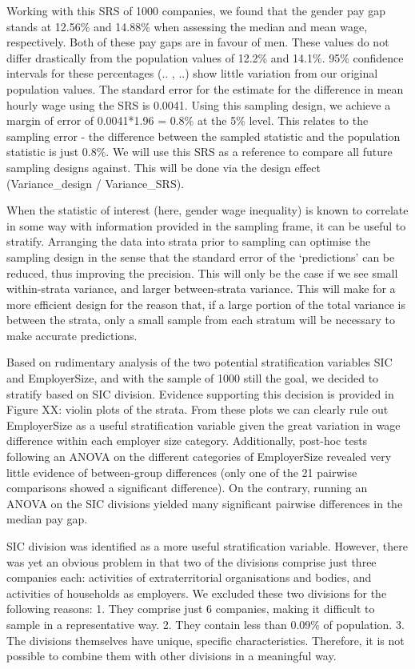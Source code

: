 \documentclass[]{article}
\begin{document}
Working with this SRS of 1000 companies, we found that the gender pay
gap stands at 12.56\% and 14.88\% when assessing the median and mean
wage, respectively. Both of these pay gaps are in favour of men. These
values do not differ drastically from the population values of 12.2\%
and 14.1\%. 95\% confidence intervals for these percentages (.. , ..)
show little variation from our original population values. The standard
error for the estimate for the difference in mean hourly wage using the
SRS is 0.0041. Using this sampling design, we achieve a margin of error
of 0.0041*1.96 = 0.8\% at the 5\% level. This relates to the sampling
error - the difference between the sampled statistic and the population
statistic is just 0.8\%. We will use this SRS as a reference to compare
all future sampling designs against. This will be done via the design
effect (Variance\_design / Variance\_SRS).

When the statistic of interest (here, gender wage inequality) is known
to correlate in some way with information provided in the sampling
frame, it can be useful to stratify. Arranging the data into strata
prior to sampling can optimise the sampling design in the sense that the
standard error of the `predictions' can be reduced, thus improving the
precision. This will only be the case if we see small within-strata
variance, and larger between-strata variance. This will make for a more
efficient design for the reason that, if a large portion of the total
variance is between the strata, only a small sample from each stratum
will be necessary to make accurate predictions.

Based on rudimentary analysis of the two potential stratification
variables SIC and EmployerSize, and with the sample of 1000 still the
goal, we decided to stratify based on SIC division. Evidence supporting
this decision is provided in Figure XX: violin plots of the strata. From
these plots we can clearly rule out EmployerSize as a useful
stratification variable given the great variation in wage difference
within each employer size category. Additionally, post-hoc tests
following an ANOVA on the different categories of EmployerSize revealed
very little evidence of between-group differences (only one of the 21
pairwise comparisons showed a significant difference). On the contrary,
running an ANOVA on the SIC divisions yielded many significant pairwise
differences in the median pay gap.

SIC division was identified as a more useful stratification variable.
However, there was yet an obvious problem in that two of the divisions
comprise just three companies each: activities of extraterritorial
organisations and bodies, and activities of households as employers. We
excluded these two divisions for the following reasons: 1. They comprise
just 6 companies, making it difficult to sample in a representative way.
2. They contain less than 0.09\% of population. 3. The divisions
themselves have unique, specific characteristics. Therefore, it is not
possible to combine them with other divisions in a meaningful way.
\end{document}
